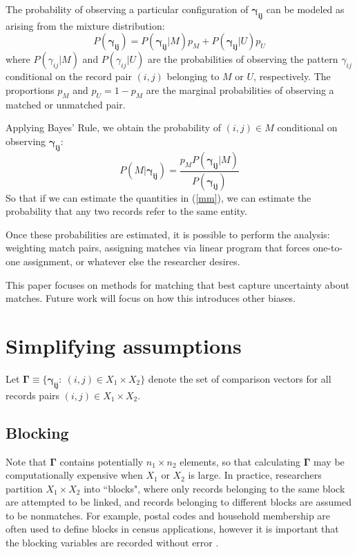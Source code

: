 \documentclass[11pt,reqno]{amsart}
\newcommand\gamij{\mathbf{\gamma_{ij}}}
\begin{document}
The probability of observing a particular configuration of $\gamij$ can be modeled as arising from the mixture distribution:
\begin{equation}
P(\gamij) = P(\gamij | M) p_M + P(\gamij | U) p_U 
\label{mm}
\end{equation}
where $P(\gamma_{ij} | M)$ and $P(\gamma_{ij} | U)$ are the probabilities of observing the pattern $\gamma_{ij}$ conditional on the record pair $(i,j)$ belonging to $M$ or $U$, respectively.  The proportions $p_M$ and $p_U = 1-p_M$ are the marginal probabilities of observing a matched or unmatched pair.  

Applying Bayes' Rule, we obtain the probability of $(i,j) \in M$ conditional on observing $\gamij$:
\begin{equation} P(M | \gamij) = \frac{p_M P(\gamij | M)}{P(\gamij)} \label{bayes} \end{equation}
So that if we can estimate the quantities in (\ref{mm}), we can estimate the probability that any two records refer to the same entity.  

Once these probabilities are estimated, it is possible to perform the analysis: weighting match pairs, assigning matches via linear program that forces one-to-one assignment, or whatever else the researcher desires.

This paper focuses on methods for matching that best capture uncertainty about matches.  Future work will focus on how this introduces other biases.


\section{Simplifying assumptions}

Let $\mathbf{\Gamma} \equiv \{\mathbf{\gamma_{ij}}: \  (i,j) \in X_1\times X_2\}$ denote the set of comparison vectors for all records pairs $(i,j) \in X_1\times X_2$.  

\subsection{Blocking} 

Note that $\mathbf{\Gamma}$ contains potentially $n_1 \times n_2$ elements, so that calculating $\mathbf{\Gamma}$ may be computationally expensive when $X_1$ or $X_2$ is large.  In practice, researchers partition $X_1\times X_2$ into ``blocks", where only records belonging to the same block are attempted to be linked, and records belonging to different blocks are assumed to be nonmatches.  For example, postal codes and household membership are often used to define blocks in census applications, however it is important that the blocking variables are recorded without error \citep{herzog2007}.
\end{document}
